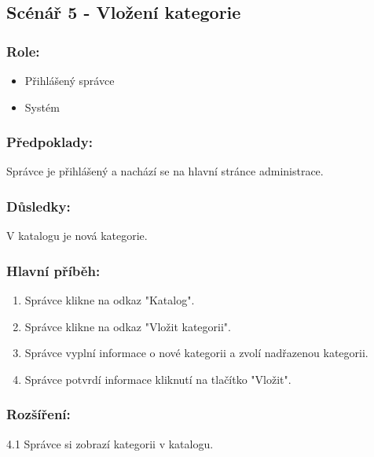 \documentclass[11pt,twoside,a4paper]{book}
\begin{document}
\subsection{Scénář 5 - Vložení kategorie}

\subsubsection*{Role:}

\begin{itemize}
\item Přihlášený správce
\item Systém
\end{itemize}

\subsubsection*{Předpoklady:}

Správce je přihlášený a nachází se na hlavní stránce administrace.

\subsubsection*{Důsledky:}

V katalogu je nová kategorie.

\subsubsection*{Hlavní příběh:}

\begin{enumerate}
\item Správce klikne na odkaz "Katalog".
\item Správce klikne na odkaz "Vložit kategorii".
\item Správce vyplní informace o nové kategorii a zvolí nadřazenou kategorii.
\item Správce potvrdí informace kliknutí na tlačítko "Vložit".
\end{enumerate}

\subsubsection*{Rozšíření:}

\begin{description}
\item  4.1 Správce si zobrazí kategorii v katalogu.
\end{description}
\end{document}
